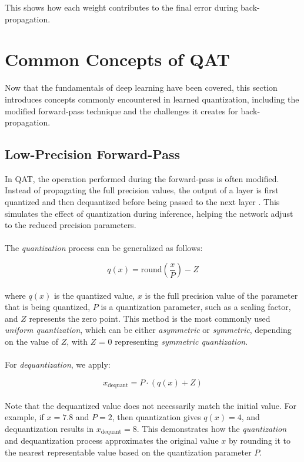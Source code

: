 \noindent This shows how each weight contributes to the final error during back-propagation.


\section{Common Concepts of QAT}
\label{sec:section2}
Now that the fundamentals of deep learning have been covered, 
this section introduces concepts commonly encountered in learned quantization, 
including the modified forward-pass technique and the challenges it creates for back-propagation.
\subsection{Low-Precision Forward-Pass}
\label{subsec:subsection1}
In QAT, the operation performed during the forward-pass is often modified. Instead of propagating the full precision values, 
the output of a layer is first quantized and then dequantized before being passed to the next layer \cite{jacob2018quantization}. 
This simulates the effect of quantization during inference, helping the network adjust to the reduced precision parameters.
\\
\\
The \textit{quantization} process can be generalized as follows:

\[
q(x) = \text{round}\left( \frac{x}{P} \right) - Z
\]
\\
\noindent where \( q(x) \) is the quantized value, \( x \) is the full precision value of the parameter that is being quantized, \( P \) is a quantization parameter, such as a scaling factor, 
and \( Z \) represents the zero point. This method is the most commonly used \textit{uniform quantization}, which can be either \textit{asymmetric} or \textit{symmetric}, 
depending on the value of \( Z \), with  \( Z \) = 0 representing \textit{symmetric quantization}.
\\
\\
For \textit{dequantization}, we apply:

\[
x_{\text{dequant}} = P \cdot ( q(x) + Z)
\]
\\
\noindent Note that the dequantized value does not necessarily match the initial value. 
For example, if \( x = 7.8 \) and \( P = 2 \), then quantization gives \( q(x) = 4 \), and dequantization results in \( x_{\text{dequant}} = 8 \). 
This demonstrates how the \textit{quantization} and dequantization process approximates the original value \( x \)
by rounding it to the nearest representable value based on the quantization parameter \( P \).

